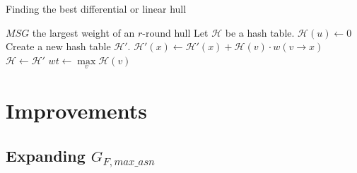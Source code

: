 \begin{algorithm}
	\caption{Finding the best differential or linear hull}
	\label{algo:4}
	\begin{algorithmic}[1]
		\Require $MSG$
		\Ensure the largest weight of an $r$-round hull
		\Procedure {}{}
		\State Let $\mathcal{H}$ be a hash table. 
		\State $\mathcal{H}(u)\leftarrow 0$
		\State Create a new hash table $\mathcal{H}'$. 
		\State $\mathcal{H}'(x)\leftarrow \mathcal{H}'(x)+\mathcal{H}(v)\cdot w(v\rightarrow x)$
		\EndFor
		\EndFor
		\State $\mathcal{H}\leftarrow \mathcal{H}'$
		\EndFor
		\State $wt\leftarrow \max\limits_{v}\mathcal{H}(v)$
		\EndIf
		\EndFor
		\State {}
		\EndProcedure
	\end{algorithmic}
\end{algorithm}






\section{Improvements}\label{sec:improvements}

\subsection{Expanding $G_{F,max\_asn}$}\label{sec:expansion}

